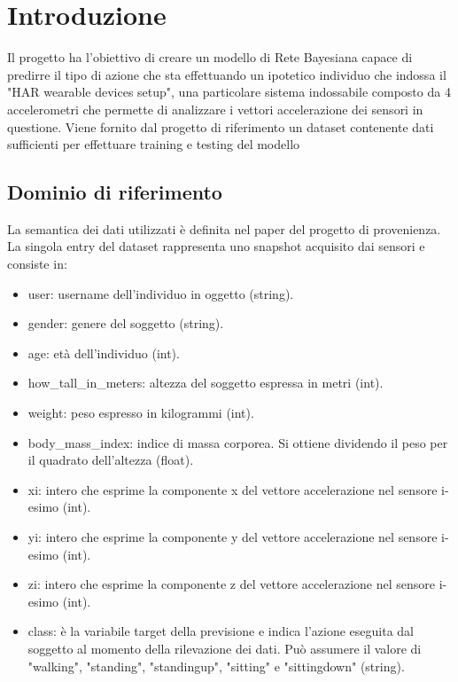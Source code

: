 \documentclass[12pt]{article}
\begin{document}

\tableofcontents
\pagebreak




\section{Introduzione}
Il progetto ha l'obiettivo di creare un modello di Rete Bayesiana capace di predirre il tipo di azione che sta effettuando un ipotetico individuo che indossa il "HAR wearable devices setup", una particolare sistema indossabile composto da 4 accelerometri che permette di analizzare i vettori accelerazione dei sensori in questione. Viene fornito dal progetto di riferimento\cite{HAR} un dataset contenente dati sufficienti per effettuare training e testing del modello

\subsection{Dominio di riferimento}
La semantica dei dati utilizzati è definita nel paper\cite{Paper} del progetto di provenienza. La singola entry del dataset rappresenta uno snapshot acquisito dai sensori e consiste in:
\begin{itemize}
	\item user: username dell'individuo in oggetto (string).
	\item gender: genere del soggetto (string).
	\item age: età dell'individuo (int).
	\item how\_tall\_in\_meters: altezza del soggetto espressa in metri (int).
	\item weight: peso espresso in kilogrammi (int).
	\item body\_mass\_index: indice di massa corporea. Si ottiene dividendo il peso per il quadrato dell'altezza (float).
	\item xi: intero che esprime la componente x del vettore accelerazione nel sensore i-esimo (int).
	\item yi: intero che esprime la componente y del vettore accelerazione nel sensore i-esimo (int).
	\item zi: intero che esprime la componente z del vettore accelerazione nel sensore i-esimo (int).
	\item class: è la variabile target della previsione e indica l'azione eseguita dal soggetto al momento della rilevazione dei dati. Può assumere il valore di "walking", "standing", "standingup", "sitting" e "sittingdown" (string).
\end{itemize}
\end{document}
